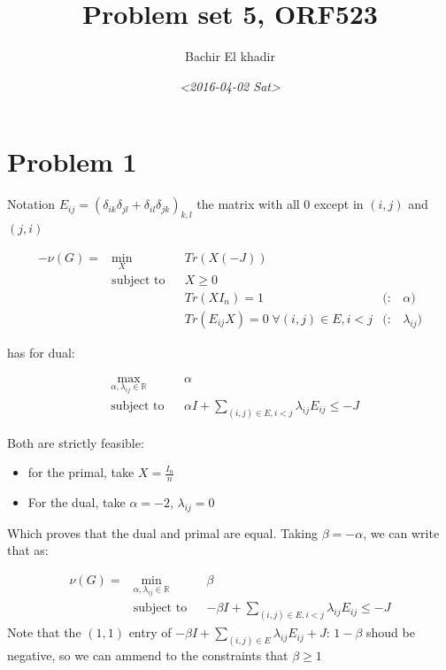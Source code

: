 \documentclass[11pt]{article}
\author{Bachir El khadir}
\date{\textit{<2016-04-02 Sat>}}
\title{Problem set 5, ORF523}
\begin{document}
\maketitle


\section{Problem 1}
\label{sec:orgheadline1}


Notation \(E_{ij} = (\delta_{ik}\delta_{jl} + \delta_{il}\delta_{jk})_{k,l}\) the matrix with all 0 except in \((i, j)\) and \((j, i)\)


\begin{align*}
-\nu(G) =
& \underset{X}{\text{min}}
& & Tr(X(-J)) \\
& \text{subject to}
& & X \ge 0
\\&&& Tr(XI_n) = 1 &(:& \alpha)
\\&&&Tr(E_{ij}X) = 0 \; \forall (i,j) \in E, i < j &(:& \lambda_{ij})
\end{align*}

has  for dual:

\begin{align*}
& \underset{\alpha, \lambda_{ij} \in \mathbb R}{\text{max}}
& & \alpha \\
& \text{subject to}
& & \alpha I + \sum_{(i,j) \in E, i < j} \lambda_{ij} E_{ij} \le -J
\end{align*}

Both are strictly feasible:
\begin{itemize}
\item for the primal, take \(X = \frac{I_n}n\)
\item For the dual, take \(\alpha = -2\), \(\lambda_{ij} = 0\)
\end{itemize}
Which proves that the dual and primal are equal. Taking  \(\beta = -\alpha\), we can write that as:



\begin{align*}
\nu(G) = 
& \underset{\alpha, \lambda_{ij} \in \mathbb R}{\text{min}}
& & \beta \\
& \text{subject to}
& & -\beta I + \sum_{(i,j) \in E, i < j} \lambda_{ij} E_{ij} \le -J
\end{align*}
Note that the \((1, 1)\) entry of \(-\beta I + \sum_{(i,j) \in E} \lambda_{ij} E_{ij} + J\): \(1-\beta\) shoud be negative, so we can ammend to the constraints that \(\beta \ge 1\)
\end{document}
